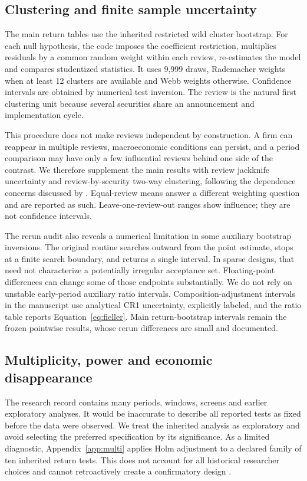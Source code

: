 \subsection{Clustering and finite sample uncertainty}

The main return tables use the inherited restricted wild cluster bootstrap. For each null hypothesis, the code imposes the coefficient restriction, multiplies residuals by a common random weight within each review, re-estimates the model and compares studentized statistics. It uses 9,999 draws, Rademacher weights when at least 12 clusters are available and Webb weights otherwise. Confidence intervals are obtained by numerical test inversion. The review is the natural first clustering unit because several securities share an announcement and implementation cycle.

This procedure does not make reviews independent by construction. A firm can reappear in multiple reviews, macroeconomic conditions can persist, and a period comparison may have only a few influential reviews behind one side of the contrast. We therefore supplement the main results with review jackknife uncertainty and review-by-security two-way clustering, following the dependence concerns discussed by \citet{petersen2009,cameron2011,mackinnon2023}. Equal-review means answer a different weighting question and are reported as such. Leave-one-review-out ranges show influence; they are not confidence intervals.

The rerun audit also reveals a numerical limitation in some auxiliary bootstrap inversions. The original routine searches outward from the point estimate, stops at a finite search boundary, and returns a single interval. In sparse designs, that need not characterize a potentially irregular acceptance set. Floating-point differences can change some of those endpoints substantially. We do not rely on unstable early-period auxiliary ratio intervals. Composition-adjustment intervals in the manuscript use analytical CR1 uncertainty, explicitly labeled, and the ratio table reports Equation~\eqref{eq:fieller}. Main return-bootstrap intervals remain the frozen pointwise results, whose rerun differences are small and documented.

\subsection{Multiplicity, power and economic disappearance}

The research record contains many periods, windows, screens and earlier exploratory analyses. It would be inaccurate to describe all reported tests as fixed before the data were observed. We treat the inherited analysis as exploratory and avoid selecting the preferred specification by its significance. As a limited diagnostic, Appendix~\ref{app:multi} applies Holm adjustment to a declared family of ten inherited return tests. This does not account for all historical researcher choices and cannot retroactively create a confirmatory design \citep{holm1979}.

